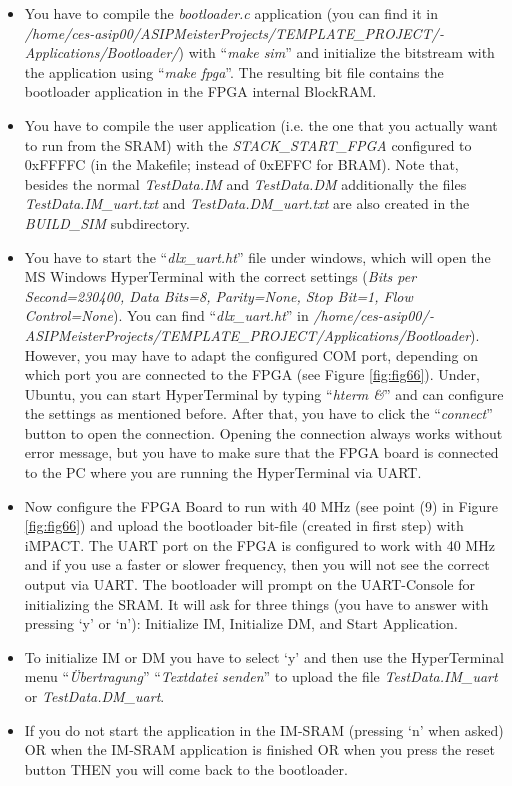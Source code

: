 \begin{itemize}
\item
  You have to compile the \emph{bootloader.c} application (you can find
  it in
  \emph{/home/ces-asip00/­ASIPMeisterProjects/­TEMPLATE\_PROJECT/­Applications/­Bootloader/})
  with ``\emph{make sim}'' and initialize the bitstream with the
  application using ``\emph{make fpga}''. The resulting bit file
  contains the bootloader application in the FPGA internal BlockRAM.
\item
  You have to compile the user application (i.e. the one that you
  actually want to run from the SRAM) with the \emph{STACK\_START\_FPGA}
  configured to 0xFFFFC (in the Makefile; instead of 0xEFFC for BRAM).
  Note that, besides the normal \emph{TestData.IM} and
  \emph{TestData.DM} additionally the files \emph{TestData.IM\_uart.txt}
  and \emph{TestData.DM\_uart.txt} are also created in the
  \emph{BUILD\_SIM} subdirectory.
\item
  You have to start the ``\emph{dlx\_uart.ht}'' file under windows,
  which will open the MS Windows HyperTerminal with the correct settings
  (\emph{Bits per Second=230400, Data Bits=8, Parity=None, Stop Bit=1,
  Flow Control=None}). You can find ``\emph{dlx\_uart.ht}'' in
  \emph{/home/ces-asip00/­ASIPMeisterProjects/­TEMPLATE\_PROJECT/­Applications/­Bootloader}).
  However, you may have to adapt the configured COM port, depending on
  which port you are connected to the FPGA (see
 Figure \ref{fig:fig66}). Under, Ubuntu, you can start
  HyperTerminal by typing ``\emph{hterm \&}'' and can configure the
  settings as mentioned before. After that, you have to click the
  ``\emph{connect}'' button to open the connection. Opening the
  connection always works without error message, but you have to make
  sure that the FPGA board is connected to the PC where you are running
  the HyperTerminal via UART.
\item
  Now configure the FPGA Board to run with 40 MHz (see point (9) in
  Figure \ref{fig:fig66}) and upload the bootloader
  bit-file (created in first step) with iMPACT. The UART port on the
  FPGA is configured to work with 40 MHz and if you use a faster or
  slower frequency, then you will not see the correct output via UART.
  The bootloader will prompt on the UART-Console for initializing the
  SRAM. It will ask for three things (you have to answer with pressing
  `y' or `n'): Initialize IM, Initialize DM, and Start Application.
\item
  To initialize IM or DM you have to select `y' and then use the
  HyperTerminal menu ``\emph{Übertragung}'' ``\emph{Textdatei senden}''
  to upload the file \emph{TestData.IM\_uart} or
  \emph{TestData.DM\_uart}.
\item
  If you do not start the application in the IM-SRAM (pressing `n' when
  asked) OR when the IM-SRAM application is finished OR when you press
  the reset button THEN you will come back to the bootloader.
\end{itemize}
